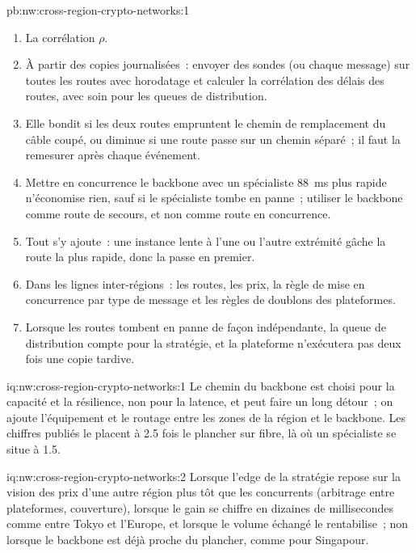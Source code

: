 \begin{solution}{pb:nw:cross-region-crypto-networks:1}
\begin{enumerate}[resume]
\item La corrélation $\rho$.
\item À partir des copies journalisées~: envoyer des sondes (ou chaque message) sur toutes les routes avec horodatage et calculer la corrélation des délais des routes, avec soin pour
  les queues de distribution.
\item Elle bondit si les deux routes empruntent le chemin de remplacement du câble coupé, ou diminue si une route passe sur un chemin séparé~; il faut la remesurer après chaque événement.
\item Mettre en concurrence le backbone avec un spécialiste \qty{88}{\milli\second} plus rapide n'économise rien, sauf si le spécialiste tombe en panne~; utiliser le backbone comme route de secours,
  et non comme route en concurrence.
\item Tout s'y ajoute~: une instance lente à l'une ou l'autre extrémité gâche la route la plus rapide, donc la  passe en premier.
\item Dans les lignes inter-régions~: les routes, les prix, la règle de mise en concurrence par type de message et les règles de doublons des plateformes.
\item Lorsque les routes tombent en panne de façon indépendante, la queue de distribution compte pour la stratégie, et la plateforme n'exécutera pas deux fois une copie tardive.
\end{enumerate}
\end{solution}

\begin{solution}{iq:nw:cross-region-crypto-networks:1}
Le chemin du backbone est choisi pour la capacité et la résilience, non pour la latence, et peut faire un long détour~; on ajoute l'équipement et le routage entre les
zones de la région et le backbone. Les chiffres publiés le placent à 2.5 fois le plancher sur fibre, là où un spécialiste se situe à 1.5.
\end{solution}

\begin{solution}{iq:nw:cross-region-crypto-networks:2}
Lorsque l'edge de la stratégie repose sur la vision des prix d'une autre région plus tôt que les concurrents (arbitrage entre plateformes, couverture), lorsque le gain se chiffre en dizaines
de millisecondes comme entre Tokyo et l'Europe, et lorsque le volume échangé le rentabilise~; non lorsque le backbone est déjà proche du plancher, comme pour
Singapour.
\end{solution}

